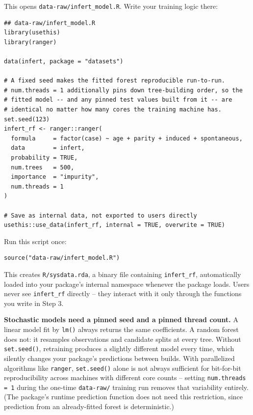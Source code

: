 \documentclass[11pt]{article}
\begin{document}
This opens \texttt{data-raw/infert\_model.R}. Write your training logic there:

\begin{lstlisting}
## data-raw/infert_model.R
library(usethis)
library(ranger)

data(infert, package = "datasets")

# A fixed seed makes the fitted forest reproducible run-to-run.
# num.threads = 1 additionally pins down tree-building order, so the
# fitted model -- and any pinned test values built from it -- are
# identical no matter how many cores the training machine has.
set.seed(123)
infert_rf <- ranger::ranger(
  formula     = factor(case) ~ age + parity + induced + spontaneous,
  data        = infert,
  probability = TRUE,
  num.trees   = 500,
  importance  = "impurity",
  num.threads = 1
)

# Save as internal data, not exported to users directly
usethis::use_data(infert_rf, internal = TRUE, overwrite = TRUE)
\end{lstlisting}

Run this script once:

\begin{lstlisting}
source("data-raw/infert_model.R")
\end{lstlisting}

This creates \texttt{R/sysdata.rda}, a binary file containing \texttt{infert\_rf}, automatically loaded into your package's internal namespace whenever the package loads. Users never see \texttt{infert\_rf} directly -- they interact with it only through the functions you write in Step 3.

\begin{warnbox}
\textbf{Stochastic models need a pinned seed and a pinned thread count.} A linear model fit by \texttt{lm()} always returns the same coefficients. A random forest does not: it resamples observations and candidate splits at every tree. Without \texttt{set.seed()}, retraining produces a slightly different model every time, which silently changes your package's predictions between builds. With parallelized algorithms like \texttt{ranger}, \texttt{set.seed()} alone is not always sufficient for bit-for-bit reproducibility across machines with different core counts -- setting \texttt{num.threads = 1} during the one-time \texttt{data-raw/} training run removes that variability entirely. (The package's runtime prediction function does not need this restriction, since prediction from an already-fitted forest is deterministic.)
\end{warnbox}
\end{document}
